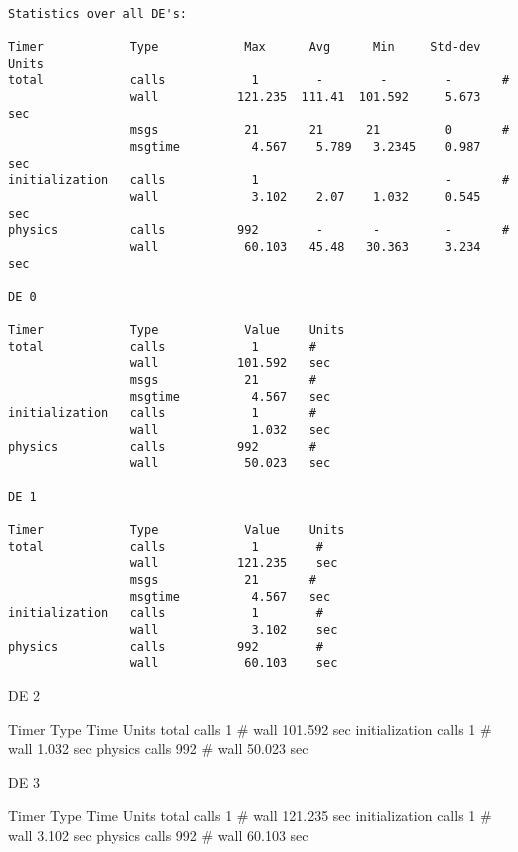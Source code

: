 {\tt
\begin{verbatim}
Statistics over all DE's:

Timer            Type            Max      Avg      Min     Std-dev  Units
total            calls            1        -        -        -       #
                 wall           121.235  111.41  101.592     5.673   sec
                 msgs            21       21      21         0       #
                 msgtime          4.567    5.789   3.2345    0.987   sec
initialization   calls            1                          -       #
                 wall             3.102    2.07    1.032     0.545   sec
physics          calls          992        -       -         -       #
                 wall            60.103   45.48   30.363     3.234   sec

DE 0

Timer            Type            Value    Units
total            calls            1       #
                 wall           101.592   sec
                 msgs            21       #
                 msgtime          4.567   sec
initialization   calls            1       #
                 wall             1.032   sec
physics          calls          992       #
                 wall            50.023   sec

DE 1

Timer            Type            Value    Units
total            calls            1        #
                 wall           121.235    sec
                 msgs            21       #
                 msgtime          4.567   sec
initialization   calls            1        #
                 wall             3.102    sec
physics          calls          992        #
                 wall            60.103    sec
\end{verbatim}
}

DE 2

Timer            Type            Time     Units
total            calls            1       #
                 wall           101.592   sec
initialization   calls            1       #
                 wall             1.032   sec
physics          calls          992       #
                 wall            50.023   sec

DE 3

Timer            Type            Time     Units
total            calls            1        #
                 wall           121.235    sec
initialization   calls            1        #
                 wall             3.102    sec
physics          calls          992        #
                 wall            60.103    sec
